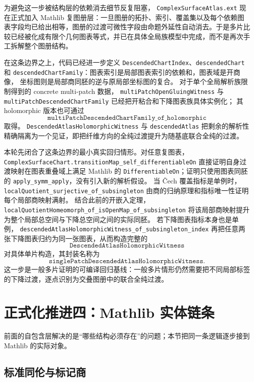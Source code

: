 \documentclass[UTF8,fontset=none,a4paper,11pt]{ctexart}
\begin{document}
为避免这一步被结构层的依赖消去细节反复阻塞，
\texttt{ComplexSurfaceAtlas.ext} 现在正式加入 Mathlib 复图册层：一旦图册的拓扑、索引、覆盖集以及每个依赖图表字段均已给出相等，图册的过渡可微性字段由命题外延性自动消去。于是多片比较已经被化成有限个几何图表等式，并已在具体全局族模型中完成，而不是再次手工拆解整个图册结构。

在这条边界之上，代码已经进一步定义
\texttt{DescendedChartIndex}、\texttt{descendedChart} 和
\texttt{descendedChartFamily}：图表索引是局部图表索引的依赖和，图表域是开商像，
坐标图则是局部商同胚的逆与原局部坐标图的复合。
对于单个全局解析族限制得到的 concrete multi-patch 数据，
\texttt{multiPatchOpenGluingWitness} 与
\texttt{multiPatchDescendedChartFamily} 已经把开粘合和下降图表族具体实例化；
其 holomorphic 版本也可通过
\[
\texttt{multiPatchDescendedChartFamily\_of\_holomorphic}
\]
取得。
\texttt{DescendedAtlasHolomorphicWitness} 与 \texttt{descendedAtlas}
把剩余的解析性精确隔离为一个见证，即把纤维方向的全纯过渡提升为随基底联合全纯的过渡。

本轮先闭合了这条边界的最小真实回归情形。对任意复图表，
\texttt{ComplexSurfaceChart.\allowbreak transitionMap\_self\allowbreak \_differentiableOn}
直接证明自身过渡映射在图表重叠域上满足 Mathlib 的
\texttt{DifferentiableOn}；证明只使用图表同胚的
\texttt{apply\_symm\_apply}，没有引入新的解析假设。
当 Čech 覆盖指标是单例时，
\texttt{localQuotient\allowbreak \_surjective\allowbreak \_of\allowbreak \_subsingleton}
由商的归纳原理和指标唯一性证明每个局部商映射满射。
结合此前的开嵌入定理，
\texttt{localQuotientHomeomorph\allowbreak \_of\allowbreak \_isOpenMap\allowbreak \_of\allowbreak \_subsingleton}
将该局部商映射提升为整个局部总空间与下降总空间之间的实际同胚。
若下降图表指标本身也是单例，
\texttt{descendedAtlasHolomorphicWitness\allowbreak \_of\allowbreak \_subsingleton\allowbreak \_index}
再把任意两张下降图表归约为同一张图表，从而构造完整的
\[
\texttt{DescendedAtlasHolomorphicWitness}
\]
对具体单片构造，其封装名称为
\[
\texttt{singlePatchDescendedAtlasHolomorphicWitness}.
\]
这一步是一般多片证明的可编译回归基线：一般多片情形仍然需要把不同局部标签的下降过渡，逐点识别为交叠图册中的联合全纯过渡。

\section{正式化推进四：Mathlib 实体链条}

前面的自包含层解决的是“哪些结构必须存在”的问题；本节把同一条逻辑逐步接到 Mathlib 的实际对象。

\subsection{标准同伦与标记商}
\end{document}
